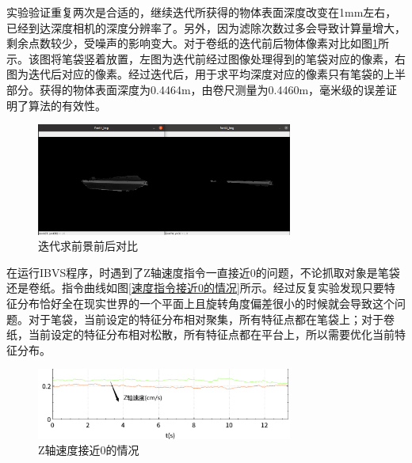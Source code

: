 \documentclass[fontset=fandol,type=bachelor,campus=harbin]{hithesisbook}
\begin{document}
实验验证重复两次是合适的，继续迭代所获得的物体表面深度改变在1mm左右，已经到达深度相机的深度分辨率了。另外，因为滤除次数过多会导致计算量增大，剩余点数较少，受噪声的影响变大。对于卷纸的迭代前后物体像素对比如图\ref{迭代求前景前后对比}所示。该图将笔袋竖着放置，左图为迭代前经过图像处理得到的笔袋对应的像素，右图为迭代后对应的像素。经过迭代后，用于求平均深度对应的像素只有笔袋的上半部分。获得的物体表面深度为0.4464m，由卷尺测量为0.4460m，毫米级的误差证明了算法的有效性。
\begin{figure}[h]
\centering
\includegraphics[width = 0.75\textwidth]{chapter4/迭代求前景前后对比}
\caption{迭代求前景前后对比}
\label{迭代求前景前后对比}
\end{figure}


在运行IBVS程序，时遇到了Z轴速度指令一直接近0的问题，不论抓取对象是笔袋还是卷纸。指令曲线如图\ref{速度指令接近0的情况}所示。经过反复实验发现只要特征分布恰好全在现实世界的一个平面上且旋转角度偏差很小的时候就会导致这个问题。对于笔袋，当前设定的特征分布相对聚集，所有特征点都在笔袋上；对于卷纸，当前设定的特征分布相对松散，所有特征点都在平台上，所以需要优化当前特征分布。\begin{figure}[h]
\centering
\includegraphics[width = 0.75\textwidth]{chapter4/Z轴速度接近0的情况}
\caption{Z轴速度接近0的情况}
\label{Z轴速度接近0的情况}
\end{figure}
\end{document}
